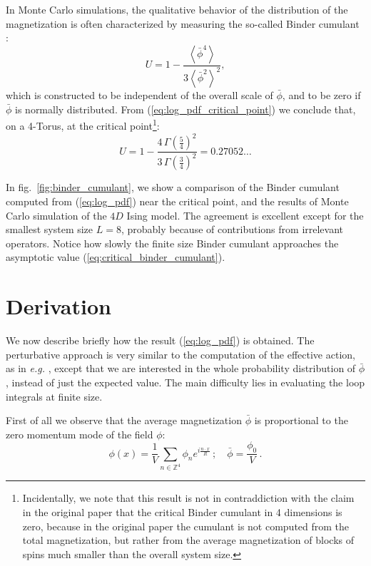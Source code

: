 \documentclass[11pt,a4paper]{article}
\begin{document}
In Monte Carlo simulations, the qualitative behavior of the distribution of the
magnetization is often characterized by measuring the so-called Binder
cumulant \cite{Binder1981}:
\begin{equation}
    U = 1 - \frac{\left\langle \bar \phi^4 \right \rangle}
    {3\left\langle \bar \phi^2 \right \rangle^2},
\end{equation}
which is constructed to be independent of the overall scale of $\bar{\phi}$,
and to be zero if $\bar{\phi}$ is normally distributed. From
(\ref{eq:log_pdf_critical_point}) we conclude that, on a 4-Torus, at the
critical point\footnote{ Incidentally, we note that this result is not in
contraddiction with the claim in the original paper \cite{Binder1981} that the
critical Binder cumulant in 4 dimensions is zero, because in the original paper
the cumulant is not computed from the total magnetization, but rather from the
average magnetization of blocks of spins much smaller than the overall system
size.}:
\begin{equation}
    \label{eq:critical_binder_cumulant}
    U = 1 - \frac{4\,\Gamma\left(\frac{5}{4}\right)^2}
    {3\,\Gamma\left(\frac{3}{4}\right)^2} 
    = 0.27052\ldots
\end{equation}


In fig.~\ref{fig:binder_cumulant}, we show a comparison of the Binder cumulant
computed from (\ref{eq:log_pdf}) near the critical point, and the results of
Monte Carlo simulation of the $4D$ Ising model. The agreement is excellent except
for the smallest system size $L = 8$, probably because of contributions from
irrelevant operators. Notice how slowly the finite size Binder cumulant
approaches the asymptotic value (\ref{eq:critical_binder_cumulant}).

\section{Derivation}

We now describe briefly how the result (\ref{eq:log_pdf}) is obtained. The
perturbative approach is very similar to the computation of the effective
action, as in \textit{e.g.} \cite{WeinbergEffectiveAction}, except that we are
interested in the whole probability distribution of $\bar{\phi}$, instead of
just the expected value. The main difficulty lies in evaluating the loop
integrals at finite size.

First of all we observe that the average magnetization
$\bar{\phi}$ is proportional to the zero momentum mode of the field $\phi$:
\begin{equation}
    \phi(x) = \frac{1}{V} \sum_{n \in \mathbb{Z}^4} \phi_{n} 
    e^{i \frac{n\cdot x}{R}}\,;\quad \bar{\phi} = \frac{\phi_{0}}{V}\,.
\end{equation}
\end{document}
